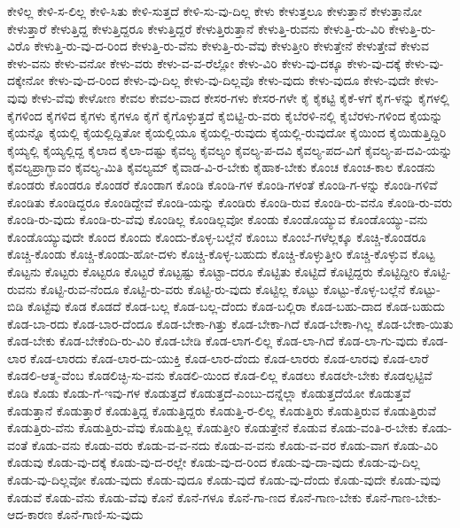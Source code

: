 {ಕೇಳಿಲ್ಲ
ಕೇಳಿ-ಸ-ಲಿಲ್ಲ
ಕೇಳಿ-ಸಿತು
ಕೇಳಿ-ಸುತ್ತದೆ
ಕೇಳಿ-ಸು-ವು-ದಿಲ್ಲ
ಕೇಳು
ಕೇಳುತ್ತಲೂ
ಕೇಳುತ್ತಾನೆ
ಕೇಳುತ್ತಾನೋ
ಕೇಳುತ್ತಾರೆ
ಕೇಳುತ್ತಿದ್ದ
ಕೇಳುತ್ತಿದ್ದರೂ
ಕೇಳುತ್ತಿದ್ದರೆ
ಕೇಳುತ್ತಿರುತ್ತಾನೆ
ಕೇಳುತ್ತಿ-ರುವನು
ಕೇಳುತ್ತಿ-ರು-ವಿರಿ
ಕೇಳುತ್ತಿ-ರು-ವಿರೊ
ಕೇಳುತ್ತಿ-ರು-ವು-ದ-ರಿಂದ
ಕೇಳುತ್ತಿ-ರು-ವೆನು
ಕೇಳುತ್ತಿ-ರು-ವೆವು
ಕೇಳುತ್ತೀರಿ
ಕೇಳುತ್ತೇನೆ
ಕೇಳುತ್ತೇವೆ
ಕೇಳುವ
ಕೇಳು-ವನು
ಕೇಳು-ವನೋ
ಕೇಳು-ವರು
ಕೇಳು-ವ-ವ-ರೆಲ್ಲೋ
ಕೇಳು-ವಿರಿ
ಕೇಳು-ವು-ದಕ್ಕೂ
ಕೇಳು-ವು-ದಕ್ಕೆ
ಕೇಳು-ವು-ದಕ್ಕೇನೋ
ಕೇಳು-ವು-ದ-ರಿಂದ
ಕೇಳು-ವು-ದಿಲ್ಲ
ಕೇಳು-ವು-ದಿಲ್ಲವೊ
ಕೇಳು-ವುದು
ಕೇಳು-ವುದೂ
ಕೇಳು-ವುದೇ
ಕೇಳು-ವುವು
ಕೇಳು-ವೆವು
ಕೇಳೋಣ
ಕೇವಲ
ಕೇವಲ-ವಾದ
ಕೇಸರ-ಗಳು
ಕೇಸರ-ಗಳೇ
ಕೈ
ಕೈಕಟ್ಟಿ
ಕೈಕೆ-ಳಗೆ
ಕೈಗ-ಳನ್ನು
ಕೈಗಳಲ್ಲಿ
ಕೈಗಳಿಂದ
ಕೈಗಳಿದ
ಕೈಗಳು
ಕೈಗಳೂ
ಕೈಗೆ
ಕೈಗೊಳ್ಳುತ್ತದೆ
ಕೈಬಿಟ್ಟಿ-ರು-ವರು
ಕೈಬೆರಳಿ-ನಲ್ಲಿ
ಕೈಬೆರಳು-ಗಳಿಂದ
ಕೈಯನ್ನು
ಕೈಯನ್ನೊ
ಕೈಯಲ್ಲಿ
ಕೈಯಲ್ಲಿದ್ದಿತೋ
ಕೈಯಲ್ಲಿಯೂ
ಕೈಯಲ್ಲಿ-ರುವುದು
ಕೈಯಲ್ಲಿ-ರುವುದೋ
ಕೈಯಿಂದ
ಕೈಯಿಡುತ್ತಿದ್ದಿರಿ
ಕೈಯ್ಯಲ್ಲಿ
ಕೈಯ್ಯಲ್ಲಿದ್ದ
ಕೈಲಾದ
ಕೈಲಾ-ದಷ್ಟು
ಕೈವಲ್ಯ
ಕೈವಲ್ಯಂ
ಕೈವಲ್ಯ-ಪ-ದವಿ
ಕೈವಲ್ಯ-ಪದ-ವಿಗೆ
ಕೈವಲ್ಯ-ಪ-ದವಿ-ಯನ್ನು
ಕೈವಲ್ಯಪ್ರಾಗ್ಭಾವಂ
ಕೈವಲ್ಯ-ಮಿತಿ
ಕೈವಲ್ಯಮ್
ಕೈವಾಡ-ವಿ-ರ-ಬೇಕು
ಕೈಹಾಕ-ಬೇಕು
ಕೊಂಚ
ಕೊಂಚ-ಕಾಲ
ಕೊಂಡನು
ಕೊಂಡರು
ಕೊಂಡರೂ
ಕೊಂಡರೆ
ಕೊಂಡಾಗ
ಕೊಂಡಿ
ಕೊಂಡಿ-ಗಳ
ಕೊಂಡಿ-ಗಳಂತೆ
ಕೊಂಡಿ-ಗ-ಳನ್ನು
ಕೊಂಡಿ-ಗಳಿವೆ
ಕೊಂಡಿತು
ಕೊಂಡಿದ್ದರೂ
ಕೊಂಡಿದ್ದೇವೆ
ಕೊಂಡಿ-ಯನ್ನು
ಕೊಂಡಿರು
ಕೊಂಡಿ-ರುವ
ಕೊಂಡಿ-ರು-ವನೊ
ಕೊಂಡಿ-ರು-ವರು
ಕೊಂಡಿ-ರು-ವುದು
ಕೊಂಡಿ-ರು-ವೆವು
ಕೊಂಡಿಲ್ಲ
ಕೊಂಡಿಲ್ಲವೋ
ಕೊಂಡು
ಕೊಂಡೊಯ್ಯುವ
ಕೊಂಡೊಯ್ಯು-ವನು
ಕೊಂಡೊಯ್ಯುವುದೇ
ಕೊಂದ
ಕೊಂದು
ಕೊಂದು-ಕೊಳ್ಳ-ಬಲ್ಲೆನೆ
ಕೊಂಬು
ಕೊಂಬೆ-ಗಳೆಲ್ಲಕ್ಕೂ
ಕೊಚ್ಚಿ-ಕೊಂಡರೂ
ಕೊಚ್ಚಿ-ಕೊಂಡು
ಕೊಚ್ಚಿ-ಕೊಂಡು-ಹೋ-ದಳು
ಕೊಚ್ಚಿ-ಕೊಳ್ಳ-ಬಹುದು
ಕೊಚ್ಚಿ-ಕೊಳ್ಳುತ್ತೀರಿ
ಕೊಚ್ಚಿ-ಕೊಳ್ಳುವ
ಕೊಟ್ಟ
ಕೊಟ್ಟನು
ಕೊಟ್ಟರು
ಕೊಟ್ಟರೂ
ಕೊಟ್ಟರೆ
ಕೊಟ್ಟಷ್ಟು
ಕೊಟ್ಟಾ-ದರೂ
ಕೊಟ್ಟಿತು
ಕೊಟ್ಟಿದೆ
ಕೊಟ್ಟಿದ್ದರು
ಕೊಟ್ಟಿದ್ದೀರಿ
ಕೊಟ್ಟಿ-ರುವನು
ಕೊಟ್ಟಿ-ರುವ-ನೆಂದೂ
ಕೊಟ್ಟಿ-ರು-ವರು
ಕೊಟ್ಟಿ-ರು-ವುದು
ಕೊಟ್ಟಿಲ್ಲ
ಕೊಟ್ಟು
ಕೊಟ್ಟು-ಕೊಳ್ಳ-ಬಲ್ಲೆನೆ
ಕೊಟ್ಟು-ಬಿಡಿ
ಕೊಟ್ಟೆವು
ಕೊಡ
ಕೊಡದೆ
ಕೊಡ-ಬಲ್ಲ
ಕೊಡ-ಬಲ್ಲ-ದೆಂದು
ಕೊಡ-ಬಲ್ಲಿರಾ
ಕೊಡ-ಬಹು-ದಾದ
ಕೊಡ-ಬಹುದು
ಕೊಡ-ಬಾ-ರದು
ಕೊಡ-ಬಾರ-ದೆಂದೂ
ಕೊಡ-ಬೇಕಾ-ಗಿತ್ತು
ಕೊಡ-ಬೇಕಾ-ಗಿದೆ
ಕೊಡ-ಬೇಕಾ-ಗಿಲ್ಲ
ಕೊಡ-ಬೇಕಾ-ಯಿತು
ಕೊಡ-ಬೇಕು
ಕೊಡ-ಬೇಕೆಂದಿ-ರು-ವಿರಿ
ಕೊಡ-ಬೇಡಿ
ಕೊಡ-ಲಾಗ-ಲಿಲ್ಲ
ಕೊಡ-ಲಾ-ಗಿದೆ
ಕೊಡ-ಲಾ-ಗು-ವುದು
ಕೊಡ-ಲಾರ
ಕೊಡ-ಲಾರದು
ಕೊಡ-ಲಾರ-ದು-ಯುಕ್ತಿ
ಕೊಡ-ಲಾರ-ದೆಂದು
ಕೊಡ-ಲಾರರು
ಕೊಡ-ಲಾರವು
ಕೊಡ-ಲಾರೆ
ಕೊಡಲಿ-ಆತ್ಮ-ವೆಂಬ
ಕೊಡಲಿಚ್ಛಿ-ಸು-ವನು
ಕೊಡಲಿ-ಯಿಂದ
ಕೊಡ-ಲಿಲ್ಲ
ಕೊಡಲು
ಕೊಡಲೇ-ಬೇಕು
ಕೊಡಲ್ಪಟ್ಟಿವೆ
ಕೊಡಿ
ಕೊಡು
ಕೊಡು-ಗೆ-ಇವು-ಗಳ
ಕೊಡುತ್ತದೆ
ಕೊಡುತ್ತದೆ-ಎಂಬು-ದನ್ನೆಲ್ಲಾ
ಕೊಡುತ್ತದೆಯೋ
ಕೊಡುತ್ತವೆ
ಕೊಡುತ್ತಾನೆ
ಕೊಡುತ್ತಾರೆ
ಕೊಡುತ್ತಿದ್ದ
ಕೊಡುತ್ತಿದ್ದರು
ಕೊಡುತ್ತಿ-ರ-ಲಿಲ್ಲ
ಕೊಡುತ್ತಿರು
ಕೊಡುತ್ತಿರುವ
ಕೊಡುತ್ತಿರುವೆ
ಕೊಡುತ್ತಿರು-ವೆನು
ಕೊಡುತ್ತಿರು-ವೆವು
ಕೊಡುತ್ತಿಲ್ಲ
ಕೊಡುತ್ತೀರಿ
ಕೊಡುತ್ತೇನೆ
ಕೊಡುವ
ಕೊಡು-ವಂತಿ-ರ-ಬೇಕು
ಕೊಡು-ವಂತೆ
ಕೊಡು-ವನು
ಕೊಡು-ವರು
ಕೊಡು-ವ-ವ-ನದು
ಕೊಡು-ವ-ವನು
ಕೊಡು-ವ-ವರ
ಕೊಡು-ವಾಗ
ಕೊಡು-ವಿರಿ
ಕೊಡುವು
ಕೊಡು-ವು-ದಕ್ಕೆ
ಕೊಡು-ವು-ದ-ರಲ್ಲೇ
ಕೊಡು-ವು-ದ-ರಿಂದ
ಕೊಡು-ವು-ದಾ-ವುದು
ಕೊಡು-ವು-ದಿಲ್ಲ
ಕೊಡು-ವು-ದಿಲ್ಲವೋ
ಕೊಡು-ವುದು
ಕೊಡು-ವುದೂ
ಕೊಡು-ವುದೆ
ಕೊಡು-ವು-ದೆಂದು
ಕೊಡು-ವುದೇ
ಕೊಡು-ವುವು
ಕೊಡುವೆ
ಕೊಡು-ವೆನು
ಕೊಡು-ವೆವು
ಕೊನೆ
ಕೊನೆ-ಗಳೂ
ಕೊನೆ-ಗಾ-ಣದ
ಕೊನೆ-ಗಾಣ-ಬೇಕು
ಕೊನೆ-ಗಾಣ-ಬೇಕು-ಆದ-ಕಾರಣ
ಕೊನೆ-ಗಾಣಿ-ಸು-ವುದು
}
